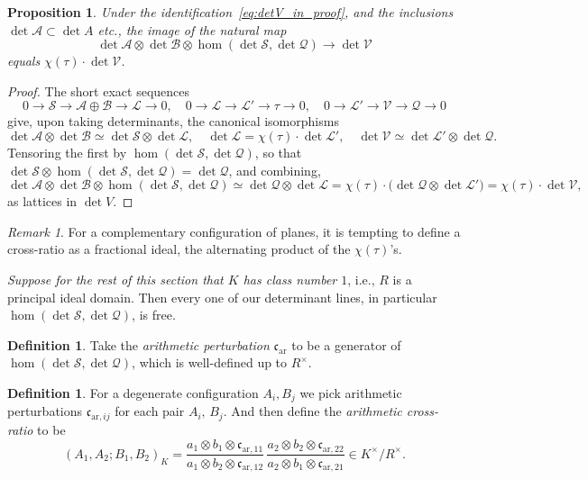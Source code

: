 \documentclass[11pt,a4paper]{amsart}
\newcommand{\xc}{\mathfrak{c}}
\theoremstyle{plain}
\newtheorem{proposition}[theorem]{Proposition}
\theoremstyle{definition}
\newtheorem{definition}[theorem]{Definition}
\theoremstyle{remark}
\newtheorem{remark}[theorem]{Remark}
\newcommand{\ca}{\mathcal{A}}
\newcommand{\cb}{\mathcal{B}}
\newcommand{\cl}{\mathcal{L}}
\newcommand{\cq}{\mathcal{Q}}
\newcommand{\cs}{\mathcal{S}}
\newcommand{\cv}{\mathcal{V}}
\newcommand{\xca}[1][]{\xc_{\mathrm{ar}#1}} %
\begin{document}
\begin{proposition}\label{prop:arithmetic_perturbation}
  Under the identification~\eqref{eq:detV_in_proof}, and the inclusions $\det \ca \subset \det A$ etc., the image of the natural map 
  \[
    \det \ca \otimes \det \cb \otimes \hom(\det \cs, \det \cq) \to \det \cv
  \]
  equals $\chi(\tau) \cdot \det \cv$.
\end{proposition}

\begin{proof}
  The short exact sequences
  \[
    0 \to \cs \to \ca \oplus \cb \to \cl \to 0, \quad
    0 \to \cl \to \cl' \to \tau \to 0, \quad
    0 \to \cl' \to \cv \to \cq \to 0
  \]
  give, upon taking determinants, the canonical isomorphisms
  \[
    \det \ca \otimes \det \cb \simeq \det \cs \otimes \det \cl, \quad
    \det \cl = \chi(\tau) \cdot \det \cl', \quad
    \det \cv \simeq \det \cl' \otimes \det \cq.
  \]
   Tensoring the first by $\hom(\det \cs, \det \cq)$, so that $\det \cs \otimes \hom(\det \cs, \det \cq) = \det \cq$, and combining,
  \[
    \det \ca \otimes \det \cb \otimes \hom(\det \cs, \det \cq) \simeq \det \cq \otimes \det \cl = \chi(\tau) \cdot \bigl(\det \cq \otimes \det \cl'\bigr) = \chi(\tau) \cdot \det \cv,
  \]
  as lattices in $\det V$.
\end{proof}

\begin{remark}\label{rem:tempt}
  For a complementary configuration of planes, it is tempting to define a cross-ratio as a fractional ideal, the alternating product of the $\chi(\tau)$'s.
\end{remark}

\medskip

\emph{Suppose for the rest of this section that $K$ has class number $1$}, i.e., $R$ is a principal ideal domain. Then every one of our determinant lines, in particular $\hom(\det \cs, \det \cq)$, is free. 

  \begin{definition}\label{def:arithmetic_perturbation}
  Take the \emph{arithmetic perturbation} $\xca$ to be a generator of $\hom(\det \cs, \det \cq)$, which is well-defined up to $R^\times$. 
\end{definition}

\begin{definition}\label{def:arithmetic_crossratio}
  For a degenerate configuration $A_i, B_j$ we pick arithmetic perturbations $\xca[,ij]$ for each pair $A_i,\, B_j$. And then define the \emph{arithmetic cross-ratio} to be
  \[
    (A_1, A_2; B_1, B_2)_K = \frac{a_1 \otimes b_1 \otimes \xca[,11]}{a_1 \otimes b_2 \otimes \xca[,12]} \, \frac{a_2 \otimes b_2 \otimes \xca[,22]}{a_2 \otimes b_1 \otimes \xca[,21]} \in K^\times/R^\times.
  \]
\end{definition}
\end{document}
